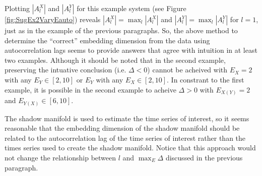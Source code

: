 \documentclass[a4paper,11pt]{article}
\begin{document}
Plotting $|A_l^X|$ and $|A_l^Y|$ for this example system (see Figure \ref{fig:SugEx2VaryEauto}) reveals $|A_l^X|=\max_l |A_l^X|$ and $|A_l^Y|=\max_l |A_l^Y|$ for $l=1$, just as in the example of the previous paragraphs.  So, the above method to determine the ``correct'' embedding dimension from the data using autocorrelation lags seems to provide answers that agree with intuition in at least two examples.  Although it should be noted that in the second example, preserving the intuative conclusion (i.e. $\Delta<0$) cannot be acheived with $E_X=2$ with any $E_Y\in[2,10]$ or $E_Y$ with any $E_X\in[2,10]$.  In constrant to the first example, it is possible in the second example to acheive $\Delta>0$ with $E_{X(Y)}=2$ and $E_{Y(X)}\in[6,10]$.

The shadow manifold is used to estimate the time series of interest, so it seems reasonable that the embedding dimension of the shadow manifold should be related to the autocorrelation lag of the time series of interest rather than the times series used to create the shadow manifold.  Notice that this approach would not change the relationship between $l$ and $\max_E \Delta$ discussed in the previous paragraph.
\end{document}
